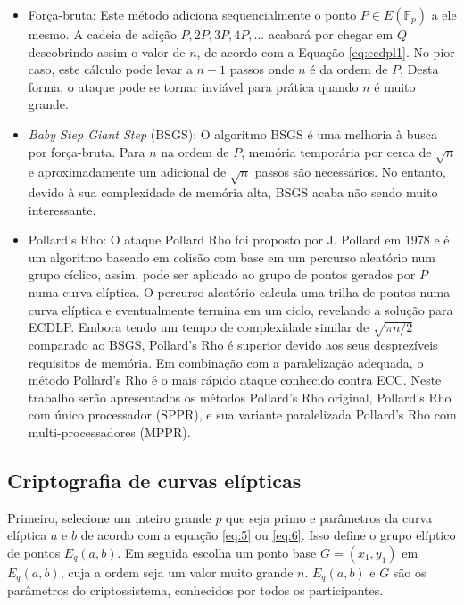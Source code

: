\begin{itemize}
\item Força-bruta: Este método adiciona sequencialmente o ponto $P \in E(\mathbb{F}_p)$ a ele mesmo. A cadeia de adição $P, 2P, 3P, 4P, ...$ acabará por chegar em \(Q\) descobrindo assim o valor de \(n\), de acordo com a Equação \ref{eq:ecdpl1}. No pior caso, este cálculo pode levar a $n - 1$ passos onde \(n\) é da ordem de \(P\). Desta forma, o ataque pode se tornar inviável para prática quando \(n\) é muito grande.
\item \textit{Baby Step Giant Step} (BSGS): O algoritmo BSGS é uma melhoria à busca por força-bruta. Para \(n\) na ordem de \(P\), memória temporária por cerca de $\sqrt{n}$ e aproximadamente um adicional de $\sqrt{n}$ passos são necessários. No entanto, devido à sua complexidade de memória alta, BSGS acaba não sendo muito interessante.
\item Pollard's Rho: O ataque Pollard Rho foi proposto por J. Pollard em 1978 e é um algoritmo baseado em colisão com base em um percurso aleatório num grupo cíclico, assim, pode ser aplicado ao grupo de pontos gerados por \(P\) numa curva elíptica. O percurso aleatório calcula uma trilha de pontos numa curva elíptica e eventualmente termina em um ciclo, revelando a solução para ECDLP. Embora tendo um tempo de complexidade similar de $\sqrt{\pi n/2}$ comparado ao BSGS, Pollard's Rho é superior devido aos seus desprezíveis requisitos de memória. Em combinação com a paralelização adequada, o método Pollard's Rho é o mais rápido ataque conhecido contra ECC. Neste trabalho serão apresentados os métodos Pollard's Rho original, Pollard's Rho com único processador (SPPR), e sua variante paralelizada Pollard's Rho com multi-processadores (MPPR).
\end{itemize}

%
%
\subsection{Criptografia de curvas elípticas}
Primeiro, selecione um inteiro grande \(p\) que seja primo e parâmetros da curva elíptica \(a\) e \(b\) de acordo com a equação \ref{eq:5} ou \ref{eq:6}. Isso define o grupo elíptico de pontos $E_q(a, b)$. Em seguida escolha um ponto base $G = (x_1, y_1)$ em $E_q(a, b)$, cuja a ordem seja um valor muito grande \(n\). $E_q(a, b)$ e \(G\) são os parâmetros do criptossistema, conhecidos por todos os participantes.

